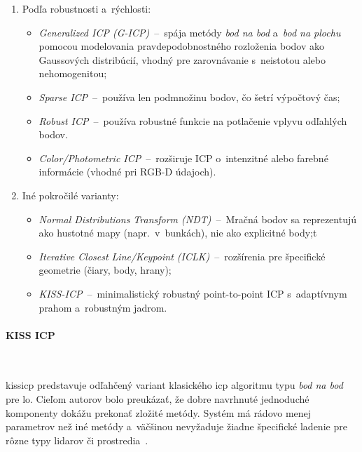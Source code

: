 \begin{enumerate}
        \item Podľa robustnosti a~rýchlosti:
        \begin{itemize}
          \item \emph{Generalized ICP (G-ICP)}~--~spája metódy \emph{bod na bod} a~\emph{bod na plochu} pomocou modelovania pravdepodobnostného rozloženia bodov ako Gaussových distribúcií, vhodný pre zarovnávanie s~neistotou alebo nehomogenitou;
          \item \emph{Sparse ICP}~--~používa len podmnožinu bodov, čo šetrí výpočtový čas;
          \item \emph{Robust ICP}~--~používa robustné funkcie na potlačenie vplyvu odľahlých bodov.
          \item \emph{Color/Photometric ICP}~--~rozširuje ICP o~intenzitné alebo farebné informácie (vhodné pri RGB-D údajoch).
        \end{itemize}
        
        \item Iné pokročilé varianty:
        \begin{itemize}
          \item \emph{Normal Distributions Transform (NDT)}~--~Mračná bodov sa reprezentujú ako hustotné mapy (napr.\ v~bunkách), nie ako explicitné body;t
          \item \emph{Iterative Closest Line/Keypoint (ICLK)}~--~rozšírenia pre špecifické geometrie (čiary, body, hrany);
          \item \emph{KISS-ICP}~--~minimalistický robustný point-to-point ICP s~adaptívnym prahom a~robustným jadrom.
        \end{itemize}
      \end{enumerate}

      \paragraph{KISS ICP} \

      \noindent \acrshort{kissicp} predstavuje odľahčený variant klasického \acrshort{icp} algoritmu typu \emph{bod na bod} pre \acrshort{lo}. Cieľom autorov bolo preukázať, že dobre navrhnuté jednoduché komponenty dokážu prekonať zložité metódy. Systém má rádovo menej parametrov než iné metódy a~väčšinou nevyžaduje žiadne špecifické ladenie pre rôzne typy lidarov či prostredia~\cite{vizzoKISSICPDefensePointtoPoint2023}.
      
